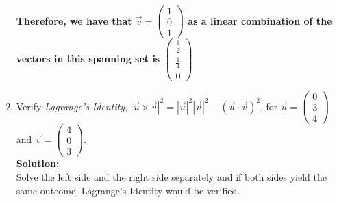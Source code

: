 \documentclass[12pt]{book}
\begin{document}
\begin{enumerate}
\textbf{Therefore, we have that $\vec{v}= \left(\begin{smallmatrix} 1 \\ 0 \\ 1 \end{smallmatrix}\right)$ as a linear combination of the vectors in this spanning set is $\left(\begin{smallmatrix} \frac{1}{2} \\ \frac{1}{4} \\ 0 \end{smallmatrix}\right)$}

\newpage

\item Verify \emph{Lagrange's Identity}, $|\vec{u} \times \vec{v}|^2 = |\vec{u}|^2|\vec{v}|^2 - (\vec{u} \cdot \vec{v})^2$, for $\vec{u} = \left(\begin{smallmatrix} 0 \\ 3 \\ 4 \end{smallmatrix}\right)$ and $\vec{v}= \left(\begin{smallmatrix} 4 \\ 0 \\ 3 \end{smallmatrix}\right)$.\\

\textbf{Solution:}\\
\setcounter{equation}{0}
Solve the left side and the right side separately and if both sides yield the same outcome, Lagrange's Identity would be verified.


\end{enumerate}
\end{document}
